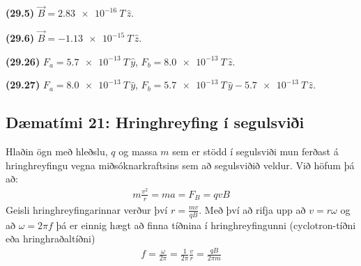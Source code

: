 \ifdefined \wholebook \else\documentclass[oneside]{book}\usepackage{EdlBook}\graphicspath{{figures/}}
\begin{document}
\begin{enumerate}[label = \textbf{(\alph*)}]
\begin{tcolorbox}
\begin{enumerate*}[label = ]
  \item \textbf{(29.5)} $\vec{B} = \SI{2.83e-16}{T} \, \hat{z}$.
  \item \textbf{(29.6)} $\vec{B} = -\SI{1.13e-15}{T}\, \hat{z}$.
  \item \textbf{(29.26)} $F_a = \SI{5.7e-13}{T}\, \hat{y}$, $F_b = \SI{8.0e-13}{T} \, \hat{z}$.
  \item \textbf{(29.27)} $F_a = \SI{8.0e-13}{T}\, \hat{y}$, $F_b = \SI{5.7e-13}{T} \, \hat{y} - \SI{5.7e-13}{T} \, \hat{z}$.
\end{enumerate*}
\end{tcolorbox}


\end{enumerate}

\newpage

\subsection*{Dæmatími 21: Hringhreyfing í segulsviði}

\begin{tcolorbox}
Hlaðin ögn með hleðslu, $q$ og massa $m$ sem er stödd í segulsviði mun ferðast á hringhreyfingu vegna miðsóknarkraftsins sem að segulsviðið veldur. Við höfum þá að:
\begin{align*}
 m\frac{v^2}{r} = ma = F_B = qvB
\end{align*}
Geisli hringhreyfingarinnar verður því $r = \frac{mv}{qB}$. Með því að rifja upp að $v = r\omega$ og að $\omega = 2\pi f$ þá er einnig hægt að finna tíðnina í hringhreyfingunni (cyclotron-tíðni eða hringhraðaltíðni)
\begin{align*}
    f = \frac{\omega}{2\pi} = \frac{1}{2\pi} \frac{v}{r} = \frac{qB}{2\pi m}
\end{align*}
\end{tcolorbox}
\end{document}
